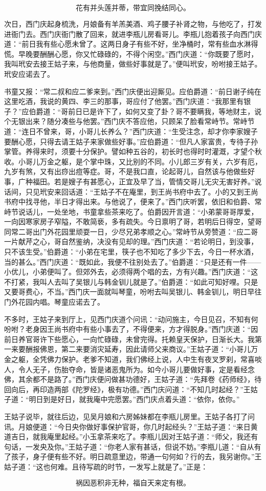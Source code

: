 \[
花有并头莲并蒂，带宜同挽结同心。
\]

次日，西门庆起身梳洗，月娘备有羊羔美酒、鸡子腰子补肾之物，与他吃了，打发进衙门去。西门庆衙门散了回来，就进李瓶儿房看哥儿。李瓶儿抱着孩子向西门庆道：“前日我有些心愿未曾了。这两日身子有些不好，坐净桶时，常有些血水淋得慌。早晚要酬酬心愿，你又忙碌碌的，不得个闲空。”西门庆道：“你既要了愿时，我叫玳安去接王姑子来，与他商量，做些好事就是了。”便叫玳安，吩咐接王姑子。玳安应诺去了。

书童又报：“常二叔和应二爹来到。”西门庆便出迎厮见。应伯爵道：“前日谢子纯在这里吃酒，我说的黄四、李三的那事，哥应付了他罢。”西门庆道：“我那里有银子？”应伯爵道：“哥前日已是许下了，如何又变了卦？哥不要瞒我，等地财主，说个无银出来？随分凑些与他罢。”西门庆不答应他，只顾呆了脸看常峙节。常峙节道：“连日不曾来，哥，小哥儿长养么？”西门庆道：“生受注念，却才你李家嫂子要酬心愿，只得去请王姑子来家做些好事。”应伯爵道：“但凡人家富贵，专待子孙掌管。养得来时，须要十分保护。譬如种五谷的，初长时也得时时灌溉，才望个秋收。小哥儿万金之躯，是个掌中珠，又比别的不同。小儿郎三岁有关，六岁有厄，九岁有煞，又有出痧出痘等症。哥，不是我口直，论起哥儿，自然该与他做些好事，广种福田。若是嫂子有甚愿心，正宜及早了当，管情交哥儿无灾无害好养。”说话间，只见玳安来回话道：“王姑子不在庵里，到王尚书府中去了。小的又到王尚书府中找寻他，半日才得出来。与他说了，便来了。”西门庆听罢，依旧和伯爵、常峙节说话儿，一处坐地，书童拿些茶来吃了。伯爵因开言道：“小弟蒙哥哥厚爱，一向因寒家房子窄隘，不敢简亵，多有疏失。今日禀明了哥，若明后日得空，望哥同常二哥出门外花园里顽耍一日，少尽兄弟孝顺之心。”常峙节从旁赞道：“应二哥一片献芹之心，哥自然鉴纳，决没有见却的理。”西门庆道：“若论明日，到没事，只不该生受。”伯爵道：“小弟在宅里，筷子也不知吃了多少下去，今日一杯水酒，当的甚么。”西门庆道：“既如此，我便不往别处去了。”伯爵道：“只是还有一件——小优儿，小弟便叫了。但郊外去，必须得两个唱的去，方有兴趣。”西门庆道：“这不打紧，我叫人去叫了吴银儿与韩金钏儿就是了。”伯爵道：“如此可知好哩。只是又要哥费心，不当。”西门庆一面就叫琴童，吩咐去叫吴银儿、韩金钏儿，明日早往门外花园内唱。琴童应诺去了。

不多时，王姑子来到厅上，见西门庆道个问讯：“动问施主，今日见召，不知有何吩咐？老身因王尚书府中有些小事去了，不得便来，方才得脱身。”西门庆道：“因前日养官哥许下些愿心，一向忙碌碌，未曾完得。托赖皇天保护，日渐长大。我第一来要酬报佛恩，第二来要消灾延寿，因此请师父来商议。”王姑子道：“小哥儿万金之躯，全凭佛力保护。老爹不知道，我们佛经上说，人中生有夜叉罗刹，常喜啖人，令人无子，伤胎夺命，皆是诸恶鬼所为。如今小哥儿要做好事，定是看经念佛，其余都不是路了。”西门庆便问做甚功德好，王姑子道：“先拜卷《药师经》，待回向后，再印造两部《陀罗经》，极有功德。”西门庆问道：“不知几时起经？”王姑子道：“明日到是好日，就我庵中完愿罢。”西门庆点着头道：“依你，依你。”

王姑子说毕，就往后边，见吴月娘和六房姊妹都在李瓶儿房里。王姑子各打了问讯。月娘便道：“今日央你做好事保护官哥，你几时起经头？”王姑子道：“来日黄道吉日，就我庵里起经。”小玉拿茶来吃了。李瓶儿因对王姑子道：“师父，我还有句话，一发央及你。”王姑子道：“你老人家有甚话，但说不妨。”李瓶儿道：“自从有了孩子，身子便有些不好。明日疏意里边，带通一句何如？行的去，我另谢你。”王姑子道：“这也何难。且待写疏的时节，一发写上就是了。”正是：

\[
祸因恶积非无种，福自天来定有根。
\]
